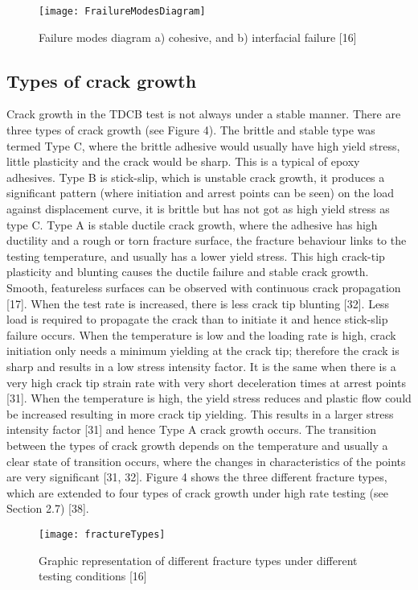 \documentclass[numbers=noendperiod,chapterprefix=on]{icldt} %
\begin{document}
\begin{figure}[!htpb]
\centering
\texttt{[image: FrailureModesDiagram]}
\caption{Failure modes diagram a) cohesive, and b) interfacial failure [16] } %
\end{figure}

\subsection{Types of crack growth}
Crack growth in the TDCB test is not always under a stable manner. There are three types of crack growth (see Figure 4). The brittle and stable type was termed Type C, where the brittle adhesive would usually have high yield stress, little plasticity and the crack would be sharp. This is a typical of epoxy adhesives. Type B is stick-slip, which is unstable crack growth, it produces a significant pattern (where initiation and arrest points can be seen) on the load against displacement curve, it is brittle but has not got as high yield stress as type C. Type A is stable ductile crack growth, where the adhesive has high ductility and a rough or torn fracture surface, the fracture behaviour links to the testing temperature, and usually has a lower yield stress. This high crack-tip plasticity and blunting causes the ductile failure and stable crack growth. Smooth, featureless surfaces can be observed with continuous crack propagation [17]. 
When the test rate is increased, there is less crack tip blunting [32]. Less load is required to propagate the crack than to initiate it and hence stick-slip failure occurs. When the temperature is low and the loading rate is high, crack initiation only needs a minimum yielding at the crack tip; therefore the crack is sharp and results in a low stress intensity factor. It is the same when there is a very high crack tip strain rate with very short deceleration times at arrest points [31]. 
When the temperature is high, the yield stress reduces and plastic flow could be increased resulting in more crack tip yielding. This results in a larger stress intensity factor [31] and hence Type A crack growth occurs. The transition between the types of crack growth depends on the temperature and usually a clear state of transition occurs, where the changes in characteristics of the points are very significant [31, 32].
Figure 4 shows the three different fracture types, which are extended to four types of crack growth under high rate testing (see Section 2.7) [38].

\begin{figure}[!htpb]
\centering
\texttt{[image: fractureTypes]}
\caption{Graphic representation of different fracture types under different testing conditions [16]}
\end{figure}
\end{document}
